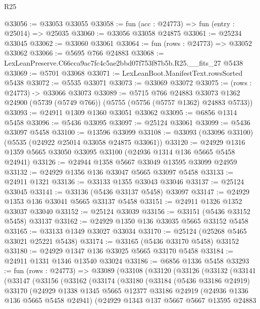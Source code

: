 \begin{lexlean}{R25}
\begin{coremodule}
@33056 := @33053 @33055
@33058 := fun (acc : @24773) => fun (entry : @25014) => @25035
@33060 := @33056 @33058 @24875
@33061 := @25234 @33045
@33062 := @33060 @33061
@33064 := fun (rows : @24773) => @33052 @33062
@33066 := @5695 @766 @24883
@33068 := LexLeanPreserve.C66cca9ac7fc4c5ae2bbd07f753f87b5b.R25.__fits_27 @5438
@33069 := @5701 @33068
@33071 := LexLeanBoot.ManifestText.rowsSorted @5438
@33072 := @5535 @33071
@33073 := @33069 @33072
@33075 := (rows : @24773) -> @33066 @33073
@33089 := @5715
    @766
    @24883
    @33073
    @1362
    @24900
    (@5739 (@5749 @766))
    (@5755 (@5756 (@5757 @1362) @24883 @5733))
@33093 := @24911 @1309 @1360 @33051 @33062
@33095 := @6856 @1314 @5458
@33096 := @5436 @33095
@33097 := @25124 @33061
@33099 := @5436 @33097 @5458
@33100 := @13596 @33099
@33108 := @33093 (@33096 @33100) (@5535 (@24922 @25014 @33058 @24875 @33061))
@33120 := @24929 @1316 @1359 @5665 @33050 @33095 @33100 (@24936 @1314 @136 @5665 @5458 @24941)
@33126 := @24944 @1358 @5667 @33049 @13595 @33099 @24959
@33132 := @24929 @1356 @136 @33047 @5665 @33097 @5458
@33133 := @24911 @1321
@33136 := @33133 @1355 @33043 @33046
@33137 := @25124 @33045
@33141 := @33136 (@5436 @33137 @5458) @33097
@33147 := @24929 @1353 @136 @33041 @5665 @33137 @5458
@33151 := @24911 @1326 @1352 @33037 @33040
@33152 := @25124 @33039
@33156 := @33151 (@5436 @33152 @5458) @33137
@33162 := @24929 @1350 @136 @33035 @5665 @33152 @5458
@33165 := @33133 @1349 @33027 @33034
@33170 := @25124 (@25268 @5465 @33021 @25221 @5438)
@33174 := @33165 (@5436 @33170 @5458) @33152
@33180 := @24929 @1347 @136 @33025 @5665 @33170 @5458
@33184 := @24911 @1331 @1346 @13540 @33024
@33186 := @6856 @1336 @5458
@33293 := fun (rows : @24773) =>
  @33089
    (@33108
      (@33120
        (@33126
          (@33132
            (@33141
              (@33147
                (@33156
                  (@33162
                    (@33174
                      (@33180
                        (@33184
                          (@5436 @33186 @24919)
                          @33170
                          (@24929
                            @1338
                            @1345
                            @5665
                            @12377
                            @33186
                            @24919
                            (@24936 @1336 @136 @5665 @5458 @24941)
                            (@24929
                              @1343
                              @137
                              @5667
                              @5667
                              @13595
                              @24883

\end{coremodule}
\end{lexlean}
